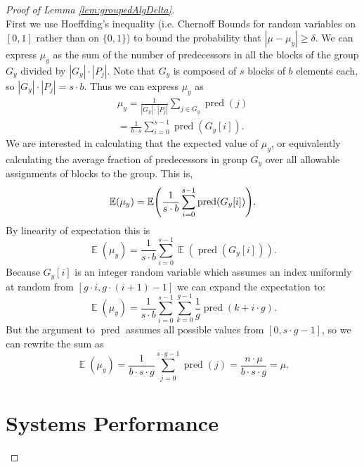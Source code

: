\documentclass[twocolumn, twoside, 11pt]{article}
\def\pred{\operatorname{pred}}
\def\E{\operatorname{\mathbb{E}}}
\DeclarePairedDelimiter{\paren}{(}{)}
\begin{document}
\begin{proof}[Proof of Lemma \ref{lem:groupedAlgDelta}]
$ $\\
First we use Hoeffding's inequality (i.e. Chernoff Bounds for random variables on $[0,1]$ rather than on $\{0,1\}$) to bound the probability that $|\mu - \mu_y| \geq \delta$. 
We can express $\mu_y$ as the sum of the number of predecessors in all the blocks of the group $G_y$ divided by $|G_y|\cdot|P_j|$.
Note that $G_y$ is composed of $s$ blocks of $b$ elements each, so $|G_y|\cdot|P_j| = s\cdot b$.
Thus we can express $\mu_y$ as \\
\begin{equation}
	\begin{split}
	\mu_y = \frac{1}{|G_y|\cdot|P_j|}\sum_{j \in G_y} \pred(j) \\
	= \frac{1}{b \cdot s}\sum_{i=0}^{s-1}\pred(G_y[i]).
	\end{split}
	\label{eqn:emui}
\end{equation}
We are interested in calculating that the expected value of $\mu_y$, or equivalently calculating the average fraction of predecessors in group $G_y$ over all allowable assignments of blocks to the group.
This is, 
$$\E(\mu_y) = \E\paren*{\frac{1}{s\cdot b} \sum_{i=0}^{s-1}\pred(G_y[i])}.$$
By linearity of expectation this is
$$\E(\mu_y) = \frac{1}{s\cdot b} \sum_{i=0}^{s-1}\E(\pred(G_y[i])).$$
Because $G_y[i]$ is an integer random variable which assumes an index uniformly at random from $[g \cdot i, g \cdot (i + 1) - 1]$ we can expand the expectation to:
$$\E(\mu_y) = \frac{1}{s\cdot b}\sum_{i=0}^{s-1}\sum_{k=0}^{g-1}\frac{1}{g}\pred(k+i\cdot g).$$
	But the argument to $\pred$ assumes all possible values from $[0, s\cdot g -1]$, so we can rewrite the sum as
$$\E(\mu_y) = \frac{1}{b\cdot s \cdot g}\sum_{j=0}^{s\cdot g-1}\pred(j) = \frac{n \cdot \mu}{b \cdot s \cdot g} = \mu.$$ 

	
	
\section{Systems Performance}


\end{proof}
\end{document}
